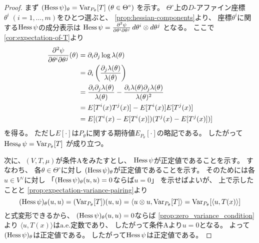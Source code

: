 \documentclass[report]{jlreq}
\begin{document}
\begin{proof}
    まず
    $(\operatorname{Hess} \psi)_\theta = \operatorname{Var}_{P_\theta}[T] \;
        (\theta \in \Theta^\circ)$
    を示す。
    $\Theta^\circ$上の$D$-アファイン座標
    $\theta^i \; (i = 1, \dots, m)$をひとつ選ぶと、
    \cref{prop:hessian-components}より、
    座標$\theta^i$に関する$\operatorname{Hess} \psi$の成分表示は
    $\operatorname{Hess}\psi
        = \frac{\partial^2 \psi}{\partial \theta^i \partial \theta^j}
        \, d\theta^i \otimes d\theta^j$
    となる。
    ここで\cref{cor:expectation-of-T}より
    \begin{alignat}{1}
        \frac{\partial^2 \psi}{\partial \theta^i \partial \theta^j}(\theta)
            &=
                \partial_i \partial_j \log \lambda(\theta)
                \\
            &=
                \partial_i \left({
                    \frac{\partial_j \lambda(\theta)}{\lambda(\theta)}
                }\right)
                \\
            &=
                \frac{
                    \partial_i \partial_j \lambda(\theta)
                }{
                    \lambda(\theta)
                }
                -
                \frac{
                    \partial_i \lambda(\theta)
                    \partial_j \lambda(\theta)
                }{
                    \lambda(\theta)^2
                }
                \\
            &=
                E[T^i(x) T^j(x)]
                -
                E[T^i(x)]
                E[T^j(x)]
                \\
            &=
                E[
                    (T^i(x) - E[T^i(x)])
                    (T^j(x) - E[T^j(x)])
                ]
    \end{alignat}
    を得る。
    ただし$E[\cdot]$は$P_\theta$に関する期待値$E_{P_\theta}[\cdot]$の略記である。
    したがって
    $\operatorname{Hess}_\theta \psi = \operatorname{Var}_{P_\theta}[T]$
    が成り立つ。

    次に、$(V, T, \mu)$が条件Aをみたすとし、
    $\operatorname{Hess}\psi$が正定値であることを示す。
    すなわち、
    各$\theta \in \Theta^\circ$に対し
    $(\operatorname{Hess}\psi)_\theta$が正定値であることを示す。
    そのためには各$u \in V^\vee$に対し
    「$(\operatorname{Hess}\psi)_\theta(u, u) = 0$ならば$u = 0$」
    を示せばよいが、
    上で示したことと
    \cref{prop:expectation-variance-pairing}より
    \begin{equation}
        (\operatorname{Hess}\psi)_\theta(u, u)
            = (\operatorname{Var}_{P_\theta}[T])(u, u)
            = \langle u \otimes u, \operatorname{Var}_{P_\theta}[T] \rangle
            = \operatorname{Var}_{P_\theta}[\langle u, T(x) \rangle]
    \end{equation}
    と式変形できるから、
    $(\operatorname{Hess}\psi)_\theta(u, u) = 0$ならば
    \cref{prop:zero_variance_condition}より
    $\langle u, T(x) \rangle$は$\text{a.e.}$定数であり、
    したがって条件Aより$u = 0$となる。
    よって$(\operatorname{Hess}\psi)_\theta$は正定値である。
    したがって$\operatorname{Hess}\psi$は正定値である。
\end{proof}
\end{document}
